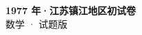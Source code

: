 \documentclass[zihao=-4, a4paper]{ctexart}
\begin{document}
\begin{center}
  {\Large\bfseries 1977 年·江苏镇江地区初试卷}\\[4pt]
  {\large 数学 · 试题版}
\end{center}
\medskip
{}

\end{document}
